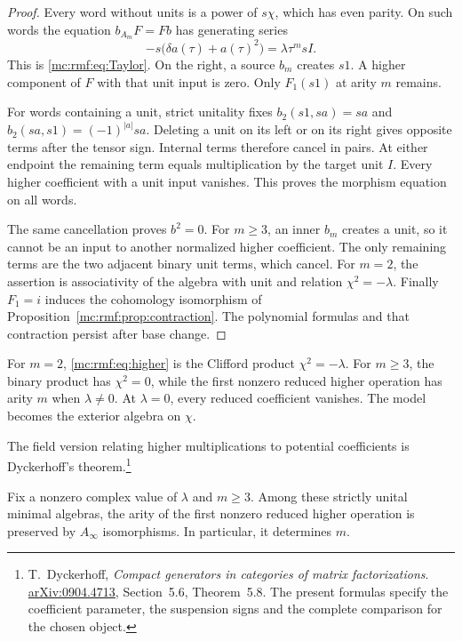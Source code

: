 \begin{proof}
Every word without units is a power of $s\chi$,
which has even parity. On such words the equation
$b_{A_m}F=Fb$ has generating series
\[
 -s\bigl(\delta a(\tau)+a(\tau)^2\bigr)
       =\lambda \tau^m sI.
\]
This is \eqref{mc:rmf:eq:Taylor}. On the right, a source
$b_m$ creates $s1$. A higher component of $F$ with that
unit input is zero. Only $F_1(s1)$ at arity $m$ remains.

For words containing a unit, strict unitality fixes
$b_2(s1,sa)=sa$ and
$b_2(sa,s1)=(-1)^{|a|}sa$.
Deleting a unit on its left or on its right gives
opposite terms after the tensor sign. Internal terms
therefore cancel in pairs. At either endpoint the
remaining term equals multiplication by the target
unit $I$. Every higher coefficient with a unit input
vanishes. This proves the morphism equation on all words.

The same cancellation proves $b^2=0$. For $m\ge3$,
an inner $b_m$ creates a unit, so it cannot be an input
to another normalized higher coefficient. The only
remaining terms are the two adjacent binary unit terms,
which cancel. For $m=2$, the assertion is associativity
of the algebra with unit and relation $\chi^2=-\lambda$.
Finally $F_1=i$ induces the cohomology isomorphism of
Proposition~\ref{mc:rmf:prop:contraction}. The polynomial
formulas and that contraction persist after base change.
\end{proof}

For $m=2$, \eqref{mc:rmf:eq:higher} is the Clifford
product $\chi^2=-\lambda$. For $m\ge3$, the binary
product has $\chi^2=0$, while the first nonzero reduced
higher operation has arity $m$ when $\lambda\ne0$.
At $\lambda=0$, every reduced coefficient vanishes.
The model becomes the exterior algebra on $\chi$.

The field version relating higher multiplications to
potential coefficients is Dyckerhoff's theorem.\footnote{
T.~Dyckerhoff, \emph{Compact generators in categories of
matrix factorizations}.
\href{https://arxiv.org/abs/0904.4713}{arXiv:0904.4713},
Section~5.6, Theorem~5.8. The present formulas specify
the coefficient parameter, the suspension signs and
the complete comparison for the chosen object.}

\begin{corollary}\label{mc:rmf:cor:multiplicity}
Fix a nonzero complex value of $\lambda$ and $m\ge3$.
Among these strictly unital minimal algebras, the arity
of the first nonzero reduced higher operation is
preserved by $A_\infty$ isomorphisms. In particular,
it determines $m$.
\end{corollary}

